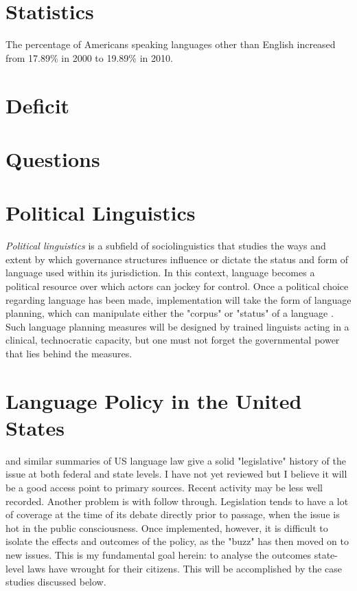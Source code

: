 \documentclass{article}
\begin{document}
\section*{Statistics}

The percentage of Americans speaking languages other than English increased from
17.89\% in 2000 to 19.89\% in 2010.

\section*{Deficit}

\section*{Questions}

\section*{Political Linguistics}

\textit{Political linguistics} is a subfield of sociolinguistics that studies the ways
and extent by which governance structures influence or dictate the status and
form of language used within its jurisdiction. In this context, language becomes
a political resource over which actors can jockey for control. Once a political
choice regarding language has been made, implementation will take the form of
language planning, which can manipulate either the "corpus" or "status" of a
language \parencite{Calvet96}. Such language planning measures will be designed
by trained linguists acting in a clinical, technocratic capacity, but one must
not forget the governmental power that lies behind the measures.

\section*{Language Policy in the United States}

\cite{Baron92} and similar summaries of US language law give a solid
"legislative" history of the issue at both federal and state levels. I have not
yet reviewed \parencite{Crawford94} but I believe it will be a good access point
to primary sources. Recent activity may be less well recorded. Another problem
is with follow through. Legislation tends to have a lot of coverage at the time
of its debate directly prior to passage, when the issue is hot in the public
consciousness. Once implemented, however, it is difficult to isolate the effects
and outcomes of the policy, as the "buzz" has then moved on to new issues. This
is my fundamental goal herein: to analyse the outcomes state-level laws have
wrought for their citizens. This will be accomplished by the case studies
discussed below.
\end{document}
